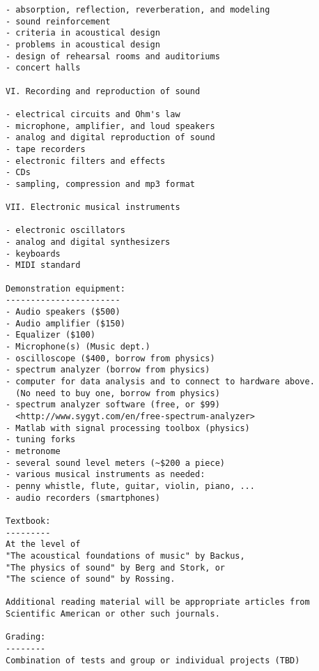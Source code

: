 \begin{verbatim}
- absorption, reflection, reverberation, and modeling
- sound reinforcement
- criteria in acoustical design
- problems in acoustical design
- design of rehearsal rooms and auditoriums
- concert halls

VI. Recording and reproduction of sound

- electrical circuits and Ohm's law
- microphone, amplifier, and loud speakers
- analog and digital reproduction of sound
- tape recorders
- electronic filters and effects
- CDs
- sampling, compression and mp3 format

VII. Electronic musical instruments

- electronic oscillators
- analog and digital synthesizers
- keyboards 
- MIDI standard

Demonstration equipment:
-----------------------
- Audio speakers ($500)
- Audio amplifier ($150)
- Equalizer ($100)
- Microphone(s) (Music dept.)
- oscilloscope ($400, borrow from physics)
- spectrum analyzer (borrow from physics)
- computer for data analysis and to connect to hardware above.
  (No need to buy one, borrow from physics)
- spectrum analyzer software (free, or $99)
  <http://www.sygyt.com/en/free-spectrum-analyzer>
- Matlab with signal processing toolbox (physics)
- tuning forks
- metronome
- several sound level meters (~$200 a piece)
- various musical instruments as needed:
- penny whistle, flute, guitar, violin, piano, ...
- audio recorders (smartphones)

Textbook:
---------
At the level of 
"The acoustical foundations of music" by Backus, 
"The physics of sound" by Berg and Stork, or 
"The science of sound" by Rossing.  

Additional reading material will be appropriate articles from
Scientific American or other such journals.

Grading:
--------
Combination of tests and group or individual projects (TBD)

\end{verbatim}
 
